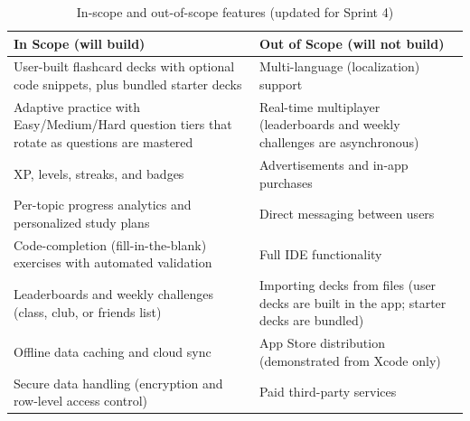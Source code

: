 \documentclass[12pt,letterpaper]{article}
\begin{document}
\begin{table}[H]
\centering
\caption{In-scope and out-of-scope features (updated for Sprint 4)}
\label{tab:scope}
\begin{tabularx}{\textwidth}{@{}Y Y@{}}
\toprule
\textbf{In Scope (will build)} & \textbf{Out of Scope (will not build)} \\
\midrule
User-built flashcard decks with optional code snippets, plus bundled starter decks & Multi-language (localization) support \\
Adaptive practice with Easy/Medium/Hard question tiers that rotate as questions are mastered & Real-time multiplayer (leaderboards and weekly challenges are asynchronous) \\
XP, levels, streaks, and badges & Advertisements and in-app purchases \\
Per-topic progress analytics and personalized study plans & Direct messaging between users \\
Code-completion (fill-in-the-blank) exercises with automated validation & Full IDE functionality \\
Leaderboards and weekly challenges (class, club, or friends list) & Importing decks from files (user decks are built in the app; starter decks are bundled) \\
Offline data caching and cloud sync & App Store distribution (demonstrated from Xcode only) \\
Secure data handling (encryption and row-level access control) & Paid third-party services \\
\bottomrule
\end{tabularx}
\end{table}
\end{document}
